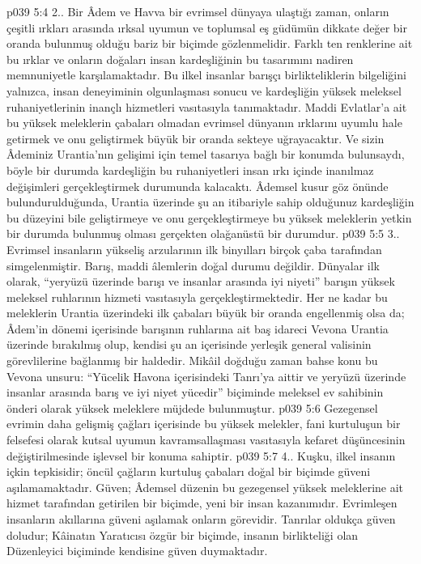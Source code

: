\vs p039 5:4 2.\bibnobreakspace {}. Bir Âdem ve Havva bir evrimsel dünyaya ulaştığı zaman, onların çeşitli ırkları arasında ırksal uyumun ve toplumsal eş güdümün dikkate değer bir oranda bulunmuş olduğu bariz bir biçimde gözlenmelidir. Farklı ten renklerine ait bu ırklar ve onların doğaları insan kardeşliğinin bu tasarımını nadiren memnuniyetle karşılamaktadır. Bu ilkel insanlar barışçı birlikteliklerin bilgeliğini yalnızca, insan deneyiminin olgunlaşması sonucu ve kardeşliğin yüksek meleksel ruhaniyetlerinin inançlı hizmetleri vasıtasıyla tanımaktadır. Maddi Evlatlar’a ait bu yüksek meleklerin çabaları olmadan evrimsel dünyanın ırklarını uyumlu hale getirmek ve onu geliştirmek büyük bir oranda sekteye uğrayacaktır. Ve sizin Âdeminiz Urantia’nın gelişimi için temel tasarıya bağlı bir konumda bulunsaydı, böyle bir durumda kardeşliğin bu ruhaniyetleri insan ırkı içinde inanılmaz değişimleri gerçekleştirmek durumunda kalacaktı. Âdemsel kusur göz önünde bulundurulduğunda, Urantia üzerinde şu an itibariyle sahip olduğunuz kardeşliğin bu düzeyini bile geliştirmeye ve onu gerçekleştirmeye bu yüksek meleklerin yetkin bir durumda bulunmuş olması gerçekten olağanüstü bir durumdur.
\vs p039 5:5 3.. Evrimsel insanların yükseliş arzularının ilk binyılları birçok çaba tarafından simgelenmiştir. Barış, maddi âlemlerin doğal durumu değildir. Dünyalar ilk olarak, “yeryüzü üzerinde barışı ve insanlar arasında iyi niyeti” barışın yüksek meleksel ruhlarının hizmeti vasıtasıyla gerçekleştirmektedir. Her ne kadar bu meleklerin Urantia üzerindeki ilk çabaları büyük bir oranda engellenmiş olsa da; Âdem’in dönemi içerisinde barışının ruhlarına ait baş idareci Vevona Urantia üzerinde bırakılmış olup, kendisi şu an içerisinde yerleşik general valisinin görevlilerine bağlanmış bir haldedir. Mikâil doğduğu zaman bahse konu bu Vevona unsuru: “Yücelik Havona içerisindeki Tanrı’ya aittir ve yeryüzü üzerinde insanlar arasında barış ve iyi niyet yücedir” biçiminde meleksel ev sahibinin önderi olarak yüksek meleklere müjdede bulunmuştur.
\vs p039 5:6 Gezegensel evrimin daha gelişmiş çağları içerisinde bu yüksek melekler, fani kurtuluşun bir felsefesi olarak kutsal uyumun kavramsallaşması vasıtasıyla kefaret düşüncesinin değiştirilmesinde işlevsel bir konuma sahiptir.
\vs p039 5:7 4.\bibnobreakspace {}. Kuşku, ilkel insanın içkin tepkisidir; öncül çağların kurtuluş çabaları doğal bir biçimde güveni aşılamamaktadır. Güven; Âdemsel düzenin bu gezegensel yüksek meleklerine ait hizmet tarafından getirilen bir biçimde, yeni bir insan kazanımıdır. Evrimleşen insanların akıllarına güveni aşılamak onların görevidir. Tanrılar oldukça güven doludur; Kâinatın Yaratıcısı özgür bir biçimde, insanın birlikteliği olan Düzenleyici biçiminde kendisine güven duymaktadır.
